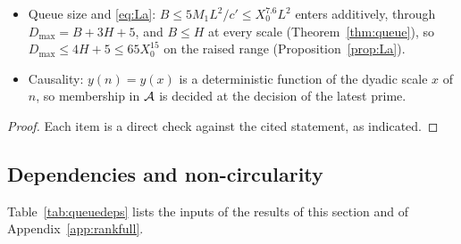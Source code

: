 \begin{lemma}
\begin{itemize}
  (Remark~\ref{rem:caplw-sizes}).
\item Queue size and \eqref{eq:La}: $B\le5M_1L^2/c'\le X_0^{7.6}L^2$ enters additively, through $D_{\max}=B+3H+5$, and
  $B\le H$ at every scale (Theorem~\ref{thm:queue}), so $D_{\max}\le4H+5\le65X_0^{15}$ on the raised range (Proposition~\ref{prop:La}).
\item Causality: $y(n)=y(x)$ is a deterministic function of the dyadic scale $x$ of $n$, so membership in $\mathcal{A}$ is decided at the decision
  of the latest prime.
\end{itemize}
\end{lemma}

\begin{proof}
Each item is a direct check against the cited statement, as indicated.
\end{proof}

\subsection{Dependencies and non-circularity}\label{sec:queue-deps}

Table~\ref{tab:queuedeps} lists the inputs of the results of this section and of Appendix~\ref{app:rankfull}.

